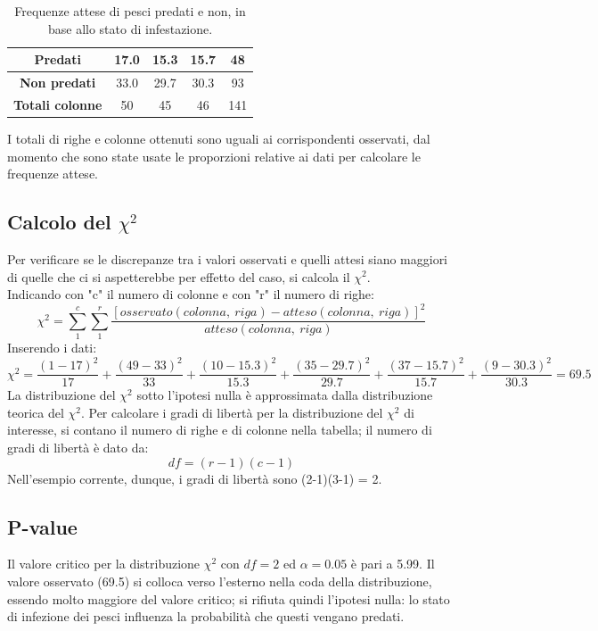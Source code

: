 \documentclass[10pt, draft]{book}
\newcounter{example}[section]
\begin{document}
\begin{example}
\begin{table}[H]
\begin{tabular}{c|c|c|c|c}
    \hline
    \textbf{Predati} & 17.0 & 15.3 & 15.7 & 48\\
    \hline
    \textbf{Non predati} & 33.0 & 29.7 & 30.3 & 93\\
    \hline
    \textbf{Totali colonne} & 50 & 45 & 46 & 141\\
    \hline
    \end{tabular}
    \caption{\small{Frequenze attese di pesci predati e non, in base allo stato di infestazione.}}
    \label{tabparassitosi2}
\end{table}\noindent
I totali di righe e colonne ottenuti sono uguali ai corrispondenti osservati, dal momento che sono state usate le proporzioni relative ai dati per calcolare le frequenze attese.

\subsection{Calcolo del \texorpdfstring{$\chi^2$}{Lg}}
Per verificare se le discrepanze tra i valori osservati e quelli attesi siano maggiori di quelle che ci si aspetterebbe per effetto del caso, si calcola il $\chi^2$.
\\
Indicando con "c" il numero di colonne e con "r" il numero di righe:
\begin{equation}
    \chi^2 = \sum^c_1 \sum^r_1 \frac{[osservato(colonna,\ riga)- atteso(colonna,\ riga)]^2}{atteso(colonna,\ riga)}
\end{equation}
Inserendo i dati:
\begin{equation}
    \chi^2 = \frac{(1-17)^2}{17}+\frac{(49-33)^2}{33}+\frac{(10-15.3)^2}{15.3}+\frac{(35-29.7)^2}{29.7}+\frac{(37-15.7)^2}{15.7}+\frac{(9-30.3)^2}{30.3} = 69.5
\end{equation}
La distribuzione del $\chi^2$ sotto l'ipotesi nulla è approssimata dalla distribuzione teorica del $\chi^2$. Per calcolare i gradi di libertà per la distribuzione del $\chi^2$ di interesse, si contano il numero di righe e di colonne nella tabella; il numero di gradi di libertà è dato da:
\begin{equation}
    df = (r-1)(c-1)
\end{equation}
Nell'esempio corrente, dunque, i gradi di libertà sono (2-1)(3-1) = 2.

\subsection{P-value}

Il valore critico per la distribuzione $\chi^2$ con $df = 2$ ed $\alpha = 0.05$ è pari a 5.99. Il valore osservato (69.5) si colloca verso l'esterno nella coda della distribuzione, essendo molto maggiore del valore critico; si rifiuta quindi l'ipotesi nulla: lo stato di infezione dei pesci influenza la probabilità che questi vengano predati.
\end{example}
\end{document}
